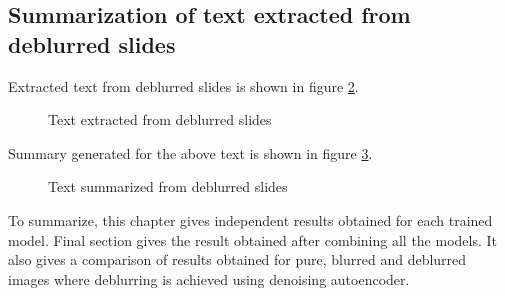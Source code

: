 \subsection{Summarization of text extracted from deblurred slides}
Extracted text from deblurred slides is shown in figure \ref{fig:deblur_text2}.
\begin{figure}[H]
\centering
	\label{fig:deblur_text1}
\end{figure}
\begin{figure}[H]
\centering
	\caption{Text extracted from deblurred slides}
	\label{fig:deblur_text2}
\end{figure}
Summary generated for the above text is shown in figure \ref{fig:deblur_sum1}.
\begin{figure}[H]
\centering
	\caption{Text summarized from deblurred slides}
	\label{fig:deblur_sum1}
\end{figure}

To summarize, this chapter gives independent results obtained for each trained model. Final section gives the result obtained after combining all the models. It also gives a comparison of results obtained for pure, blurred and deblurred images where deblurring is achieved using denoising autoencoder.




